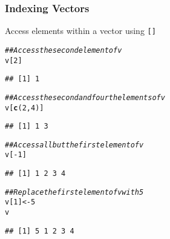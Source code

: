 \documentclass{beamer}\usepackage[]{graphicx}\usepackage[]{color}
\makeatletter
\newcommand{\hlnum}[1]{\textcolor[rgb]{0.686,0.059,0.569}{#1}}%
\newcommand{\hlcom}[1]{\textcolor[rgb]{0.678,0.584,0.686}{\textit{#1}}}%
\newcommand{\hlopt}[1]{\textcolor[rgb]{0,0,0}{#1}}%
\newcommand{\hlstd}[1]{\textcolor[rgb]{0.345,0.345,0.345}{#1}}%
\newcommand{\hlkwb}[1]{\textcolor[rgb]{0.69,0.353,0.396}{#1}}%
\newcommand{\hlkwd}[1]{\textcolor[rgb]{0.737,0.353,0.396}{\textbf{#1}}}%
\newenvironment{kframe}{%
 \def\at@end@of@kframe{}%
 \ifinner\ifhmode%
  \def\at@end@of@kframe{\end{minipage}}%
  \begin{minipage}{\columnwidth}%
 \fi\fi%
 \def\FrameCommand##1{\hskip\@totalleftmargin \hskip-\fboxsep
 \colorbox{shadecolor}{##1}\hskip-\fboxsep
     \hskip-\linewidth \hskip-\@totalleftmargin \hskip\columnwidth}%
 \MakeFramed {\advance\hsize-\width
   \@totalleftmargin\z@ \linewidth\hsize
   \@setminipage}}%
 {\par\unskip\endMakeFramed%
 \at@end@of@kframe}
\newenvironment{knitrout}{}{} %
\makeatother
\begin{document}
\begin{frame}[fragile]\frametitle{Indexing Vectors}
    Access elements within a vector using \texttt{[]}
\begin{knitrout}\footnotesize
{}\color{fgcolor}\begin{kframe}
\begin{alltt}
\hlcom{## Access the second element of v}
\hlstd{v[}\hlnum{2}\hlstd{]}
\end{alltt}
\begin{verbatim}
## [1] 1
\end{verbatim}
\begin{alltt}
\hlcom{## Access the second and fourth elements of v}
\hlstd{v[}\hlkwd{c}\hlstd{(}\hlnum{2}\hlstd{,} \hlnum{4}\hlstd{)]}
\end{alltt}
\begin{verbatim}
## [1] 1 3
\end{verbatim}
\begin{alltt}
\hlcom{## Access all but the first element of v}
\hlstd{v[}\hlopt{-}\hlnum{1}\hlstd{]}
\end{alltt}
\begin{verbatim}
## [1] 1 2 3 4
\end{verbatim}
\begin{alltt}
\hlcom{## Replace the first element of v with 5}
\hlstd{v[}\hlnum{1}\hlstd{]} \hlkwb{<-} \hlnum{5}
\hlstd{v}
\end{alltt}
\begin{verbatim}
## [1] 5 1 2 3 4
\end{verbatim}
\end{kframe}
\end{knitrout}
\end{frame}
\end{document}

